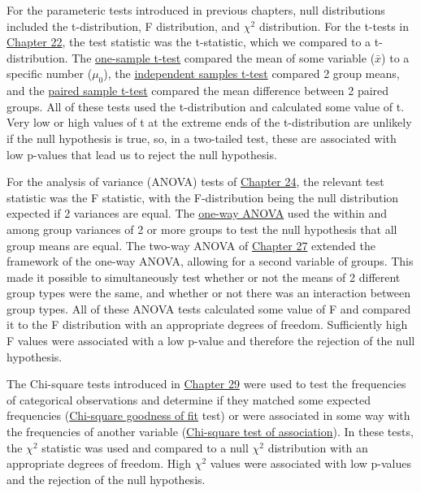 \documentclass[
  openany]{scrbook}
\begin{document}
For the parameteric tests introduced in previous chapters, null distributions included the t-distribution, F distribution, and \(\chi^{2}\) distribution.
For the t-tests in \protect\hyperlink{Chapter_22}{Chapter 22}, the test statistic was the t-statistic, which we compared to a t-distribution.
The \protect\hyperlink{one-sample-t-test}{one-sample t-test} compared the mean of some variable (\(\bar{x}\)) to a specific number (\(\mu_{0}\)), the \protect\hyperlink{independent-samples-t-test}{independent samples t-test} compared 2 group means, and the \protect\hyperlink{paired-sample-t-test}{paired sample t-test} compared the mean difference between 2 paired groups.
All of these tests used the t-distribution and calculated some value of t.
Very low or high values of t at the extreme ends of the t-distribution are unlikely if the null hypothesis is true, so, in a two-tailed test, these are associated with low p-values that lead us to reject the null hypothesis.

For the analysis of variance (ANOVA) tests of \protect\hyperlink{Chapter_24}{Chapter 24}, the relevant test statistic was the F statistic, with the F-distribution being the null distribution expected if 2 variances are equal.
The \protect\hyperlink{one-way-anova}{one-way ANOVA} used the within and among group variances of 2 or more groups to test the null hypothesis that all group means are equal.
The two-way ANOVA of \protect\hyperlink{Chapter_27}{Chapter 27} extended the framework of the one-way ANOVA, allowing for a second variable of groups.
This made it possible to simultaneously test whether or not the means of 2 different group types were the same, and whether or not there was an interaction between group types.
All of these ANOVA tests calculated some value of F and compared it to the F distribution with an appropriate degrees of freedom.
Sufficiently high F values were associated with a low p-value and therefore the rejection of the null hypothesis.

The Chi-square tests introduced in \protect\hyperlink{Chapter_29}{Chapter 29} were used to test the frequencies of categorical observations and determine if they matched some expected frequencies (\protect\hyperlink{chi-squared-goodness-of-fit}{Chi-square goodness of fit} test) or were associated in some way with the frequencies of another variable (\protect\hyperlink{chi-squared-test-of-association}{Chi-square test of association}).
In these tests, the \(\chi^{2}\) statistic was used and compared to a null \(\chi^{2}\) distribution with an appropriate degrees of freedom.
High \(\chi^{2}\) values were associated with low p-values and the rejection of the null hypothesis.
\end{document}
